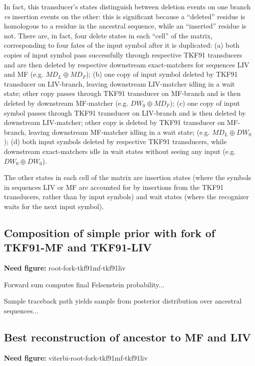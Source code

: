 \documentclass{article}
\newcommand{\needfig}[1]{{\bf Need figure: } #1 }
\begin{document}
In fact, this transducer's states distinguish between
deletion events on one branch {\em vs} insertion events on the other:
this is significant because a ``deleted'' residue is homologous to a residue in the ancestral sequence,
while an ``inserted'' residue is not.
There are, in fact, four delete states in each ``cell'' of the matrix,
corresponding to four fates of the input symbol after it is duplicated:
(a) both copies of input symbol pass successfully through respective TKF91 transducers
and are then deleted by respective downstream exact-matchers for sequences LIV and MF
 (e.g. $M D_L \oplus M D_F$);
(b) one copy of input symbol deleted by TKF91 transducer on LIV-branch,
leaving downstream LIV-matcher idling in a wait state;
other copy passes through TKF91 transducer on MF-branch and is then deleted by downstream MF-matcher
 (e.g. $D W_0 \oplus M D_F$);
(c) one copy of input symbol passes through TKF91 transducer on LIV-branch
and is then deleted by downstream LIV-matcher;
other copy is deleted by TKF91 transducer on MF-branch,
leaving downstream MF-matcher idling in a wait state;
 (e.g. $M D_L \oplus D W_0$);
(d) both input symbols deleted by respective TKF91 transducers,
while downstream exact-matchers idle in wait states without seeing any input
 (e.g. $D W_0 \oplus D W_0$).

The other states in each cell of the matrix are insertion states
(where the symbols in sequences LIV or MF are accounted for by insertions from the TKF91 transducers,
rather than by input symbols)
and wait states (where the recognizer waits for the next input symbol).



\subsection{Composition of simple prior with fork of TKF91-MF and TKF91-LIV}

\needfig{root-fork-tkf91mf-tkf91liv}

Forward sum computes final Felsenstein probability...

Sample traceback path yields sample from posterior distribution over ancestral sequences...

\subsection{Best reconstruction of ancestor to MF and LIV}

\needfig{viterbi-root-fork-tkf91mf-tkf91liv}
\end{document}

